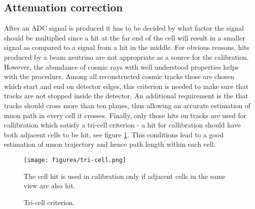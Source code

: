 \subsection{Attenuation correction}
After an ADC signal is produced it has to be decided by what factor the signal should be multiplied since a hit at
the far end of the cell will result in a smaller signal as compared to a signal from a hit in the middle. 
For obvious reasons, hits produced by a beam neutrino are not appropriate as a source for the calibration. However,
the abundance of cosmic rays with well understood properties helps with the procedure. Among all reconstructed 
cosmic tracks those are chosen which start and end on detector edges, this criterion is needed to make sure
that tracks are not stopped inside the detector. An additional requirement is the that tracks should cross more than
ten planes, thus allowing an accurate estimation of muon path in every cell it crosses. Finally, only those 
hits on tracks are used for callibration which satisfy a tri-cell criterion - a hit for callibration should
have both adjacent cells to be hit, see figure \ref{fig:tri-cell}. This conditions lead to a good estimation 
of muon trajectory and hence path length within each cell.
\begin{figure}[h]
\centering
\texttt{[image: figures/tri-cell.png]}
\caption{Tri-cell criterion.}
{The cell hit is used in calibration only if adjacent cells in the same view are also hit.}
\label{fig:tri-cell}
\end{figure}

